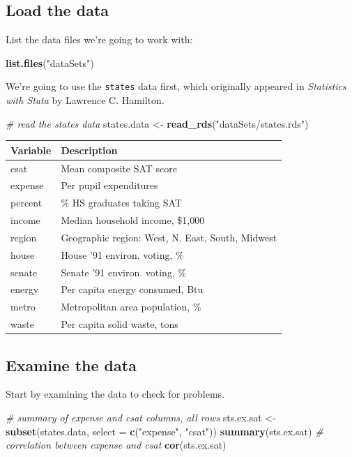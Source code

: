 \documentclass[]{book}
\newenvironment{Shaded}{\begin{snugshade}}{\end{snugshade}}
\newcommand{\KeywordTok}[1]{\textcolor[rgb]{0.13,0.29,0.53}{\textbf{#1}}}
\newcommand{\DataTypeTok}[1]{\textcolor[rgb]{0.13,0.29,0.53}{#1}}
\newcommand{\StringTok}[1]{\textcolor[rgb]{0.31,0.60,0.02}{#1}}
\newcommand{\CommentTok}[1]{\textcolor[rgb]{0.56,0.35,0.01}{\textit{#1}}}
\newcommand{\NormalTok}[1]{#1}
\begin{document}
\subsection{Load the data}\label{load-the-data}

List the data files we're going to work with:

\begin{Shaded}
\begin{Highlighting}[]
\KeywordTok{list.files}\NormalTok{(}\StringTok{"dataSets"}\NormalTok{)}
\end{Highlighting}
\end{Shaded}

We're going to use the \texttt{states} data first, which originally
appeared in \emph{Statistics with Stata} by Lawrence C. Hamilton.

\begin{Shaded}
\begin{Highlighting}[]
  \CommentTok{# read the states data}
\NormalTok{  states.data <-}\StringTok{ }\KeywordTok{read_rds}\NormalTok{(}\StringTok{"dataSets/states.rds"}\NormalTok{) }
\end{Highlighting}
\end{Shaded}

\begin{longtable}[]{@{}ll@{}}
\toprule
Variable & Description\tabularnewline
\midrule
\endhead
csat & Mean composite SAT score\tabularnewline
expense & Per pupil expenditures\tabularnewline
percent & \% HS graduates taking SAT\tabularnewline
income & Median household income, \$1,000\tabularnewline
region & Geographic region: West, N. East, South, Midwest\tabularnewline
house & House '91 environ. voting, \%\tabularnewline
senate & Senate '91 environ. voting, \%\tabularnewline
energy & Per capita energy consumed, Btu\tabularnewline
metro & Metropolitan area population, \%\tabularnewline
waste & Per capita solid waste, tons\tabularnewline
\bottomrule
\end{longtable}

\subsection{Examine the data}\label{examine-the-data}

Start by examining the data to check for problems.

\begin{Shaded}
\begin{Highlighting}[]
  \CommentTok{# summary of expense and csat columns, all rows}
\NormalTok{  sts.ex.sat <-}\StringTok{ }\KeywordTok{subset}\NormalTok{(states.data, }\DataTypeTok{select =} \KeywordTok{c}\NormalTok{(}\StringTok{"expense"}\NormalTok{, }\StringTok{"csat"}\NormalTok{))}
  \KeywordTok{summary}\NormalTok{(sts.ex.sat)}
  \CommentTok{# correlation between expense and csat}
  \KeywordTok{cor}\NormalTok{(sts.ex.sat) }
\end{Highlighting}
\end{Shaded}
\end{document}
